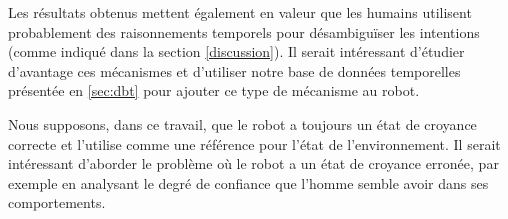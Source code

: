 \documentclass[a4paper,11pt,twoside]{StyleThese}
\begin{document}
Les résultats obtenus mettent également en valeur que les humains utilisent probablement des raisonnements temporels pour désambiguïser les intentions (comme indiqué dans la section \ref{discussion}). Il serait intéressant d'étudier d'avantage ces mécanismes et d'utiliser notre base de données temporelles présentée en \ref{sec:dbt} pour ajouter ce type de mécanisme au robot.

Nous supposons, dans ce travail, que le robot a toujours un état de croyance correcte et l'utilise comme une référence pour l'état de l'environnement. Il serait intéressant d'aborder le problème où le robot a un état de croyance erronée, par exemple en analysant le degré de confiance que l'homme semble avoir dans ses comportements.






\ifdefined{}
\else


\end{document}
